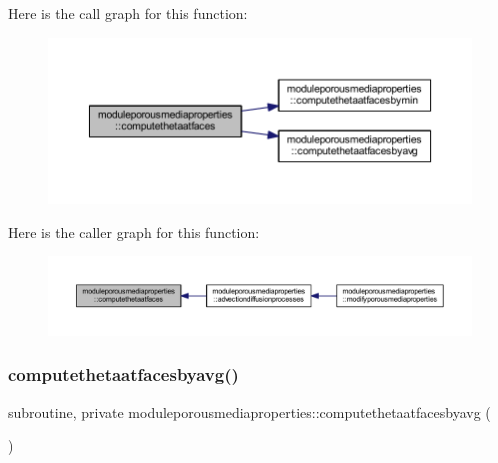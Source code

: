 Here is the call graph for this function\+:\nopagebreak
\begin{figure}[H]
\begin{center}
\leavevmode
\includegraphics[width=350pt]{namespacemoduleporousmediaproperties_a534ab2ca9e28f31cfce1876b53c263c8_cgraph}
\end{center}
\end{figure}
Here is the caller graph for this function\+:\nopagebreak
\begin{figure}[H]
\begin{center}
\leavevmode
\includegraphics[width=350pt]{namespacemoduleporousmediaproperties_a534ab2ca9e28f31cfce1876b53c263c8_icgraph}
\end{center}
\end{figure}
\mbox{\label{namespacemoduleporousmediaproperties_ac3225dfdb6a7475838f45e43263a61a9}} 
\subsubsection{\texorpdfstring{computethetaatfacesbyavg()}{computethetaatfacesbyavg()}}
{\footnotesize\ttfamily subroutine, private moduleporousmediaproperties\+::computethetaatfacesbyavg (\begin{DoxyParamCaption}{ }\end{DoxyParamCaption})\hspace{0.3cm}{\ttfamily [private]}}

